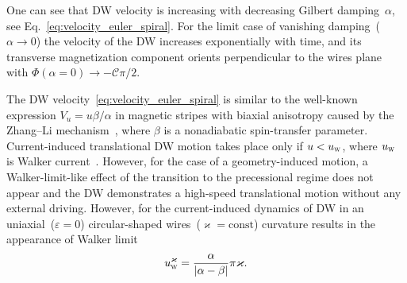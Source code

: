 One can see that DW velocity is increasing with decreasing Gilbert damping~$\alpha$, see Eq.~\eqref{eq:velocity_euler_spiral}. For the limit case of vanishing damping~($\alpha\to0$) the velocity of the DW increases exponentially with time, and its transverse magnetization component orients perpendicular to the wires plane with $\Phi(\alpha=0)\to-\mathcal{C}\pi/2$.

The DW velocity~\eqref{eq:velocity_euler_spiral} is similar to the well-known expression $V_u = u \beta/\alpha$ in magnetic stripes with biaxial anisotropy caused by the Zhang--Li mechanism~\cite{Bazaliy98,Zhang04}, where $\beta$ is a nonadiabatic spin-transfer parameter. Current-induced translational DW motion takes place only if $u<u_\textsc{w}$, where $u_\textsc{w}$ is Walker current~\cite{Thiaville05}. However, for the case of a geometry-induced motion, a Walker-limit-like effect of the transition to the precessional regime does not appear and the DW demonstrates a high-speed translational motion without any external driving. However, for the current-induced dynamics of DW in an uniaxial~($\varepsilon=0$) circular-shaped wires~($\varkappa=\text{const}$) curvature results in the appearance of Walker limit~\cite{Yershov16}
\begin{equation}
u_\textsc{w}^\varkappa=\frac{\alpha}{|\alpha-\beta|}\pi\varkappa.
\end{equation}


